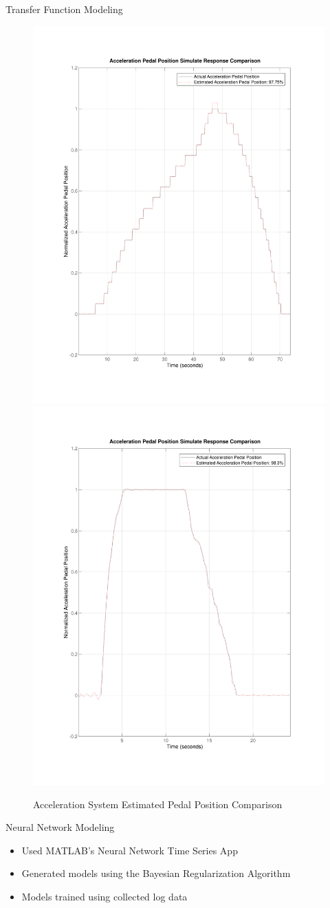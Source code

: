 \documentclass[final]{beamer}
\newlength{\onecolwid}
\begin{document}
\begin{frame}[t]
\begin{columns}[t]
\begin{column}{\onecolwid}
\begin{block}{Transfer Function Modeling}
\begin{figure}
	\centering
	{\includegraphics[width=0.48\linewidth]{figs/img/byWireAccelArxModel}}
	{\includegraphics[width=0.48\linewidth]{figs/img/manualAccelTransferFunctionModel}}
	\caption{Acceleration System Estimated Pedal Position Comparison}
\end{figure}

\end{block}


\begin{block}{Neural Network Modeling}
\vskip -1cm
\begin{itemize}
    \item Used MATLAB's Neural Network Time Series App
    \item Generated models using the Bayesian Regularization Algorithm
    \item Models trained using collected log data  
\end{itemize} 


\end{block}
\end{column}
\end{columns}
\end{frame}
\end{document}
